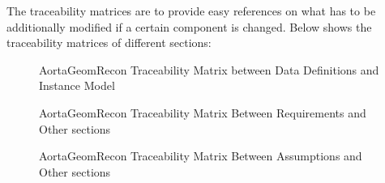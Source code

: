 \begin{itemize}
The traceability matrices are to provide easy references on what has to be additionally modified if a certain component is changed. Below shows the traceability matrices of different sections:
\begin{figure}[H]
    \centering
    \caption[AortaGeomRecon Traceability Matrix between Data Definitions and Instance Model]{AortaGeomRecon Traceability Matrix between Data Definitions and Instance Model}
    \label{fig_agr_tm_dd_im}
\end{figure}

\begin{figure}[H]
    \centering
    \caption[AortaGeomRecon Traceability Matrix Between Requirements and Other sections]{AortaGeomRecon Traceability Matrix Between Requirements and Other sections}
    \label{fig_agr_tm_im_r}
\end{figure}

\begin{figure}[H]
    \centering
    \caption[AortaGeomRecon Traceability Matrix Between Assumptions and Other sections]{AortaGeomRecon Traceability Matrix Between Assumptions and Other sections}
    \label{fig_agr_tm_a}
\end{figure}


\end{itemize}

